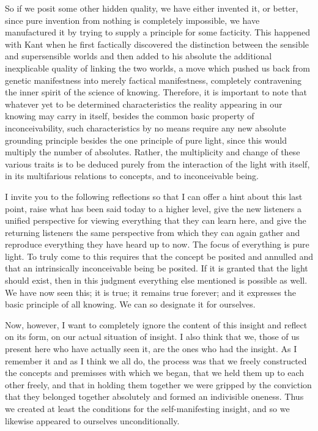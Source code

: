 So if we posit some other hidden quality,
we have either invented it, or better,
since pure invention from nothing is completely impossible,
we have manufactured it by trying to supply a principle for some facticity.
This happened with Kant when he first factically discovered
the distinction between the sensible and supersensible worlds and
then added to his absolute the additional inexplicable
quality of linking the two worlds,
a move which pushed us back from genetic manifestness
into merely factical manifestness,
completely contravening the inner spirit of the science of knowing.
Therefore, it is important to note that
whatever yet to be determined characteristics
the reality appearing in our knowing may carry in itself,
besides the common basic property of inconceivability,
such characteristics by no means require any new
absolute grounding principle besides the one principle of pure light,
since this would multiply the number of absolutes.
Rather, the multiplicity and change of these various traits is
to be deduced purely from the interaction of the light with itself,
in its multifarious relations to concepts,
and to inconceivable being.

I invite you to the following reflections
so that I can offer a hint about this last point,
raise what has been said today to a higher level,
give the new listeners a unified perspective
for viewing everything that they can learn here,
and give the returning listeners the same perspective
from which they can again gather and reproduce
everything they have heard up to now.
The focus of everything is pure light.
To truly come to this requires that
the concept be posited and annulled
and that an intrinsically inconceivable being be posited.
If it is granted that the light should exist,
then in this judgment everything else mentioned is possible as well.
We have now seen this; it is true; it remains true forever;
and it expresses the basic principle of all knowing.
We can so designate it for ourselves.

Now, however, I want to completely ignore
the content of this insight and reflect on its form,
on our actual situation of insight.
I also think that we, those of us present here
who have actually seen it,
are the ones who had the insight.
As I remember it and as I think we all do,
the process was that we freely constructed the concepts
and premisses with which we began,
that we held them up to each other freely,
and that in holding them together
we were gripped by the conviction that they
belonged together absolutely and formed an indivisible oneness.
Thus we created at least the conditions for the self-manifesting insight,
and so we likewise appeared to ourselves unconditionally.

